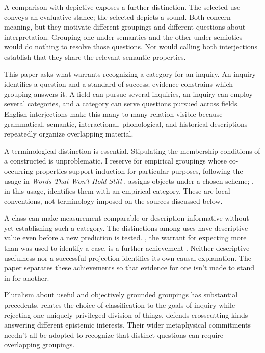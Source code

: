 A comparison with depictive  exposes a further distinction.
The selected  use conveys an evaluative stance; the selected
 depicts a sound. Both concern meaning, but they motivate
different groupings and different questions about interpretation. Grouping
one under semantics and the other under semiotics would do nothing to
resolve those questions. Nor would calling both interjections establish
that they share the relevant semantic properties.

This paper asks what warrants recognizing a category for an inquiry.
An inquiry identifies a question and a standard of success; evidence
constrains which grouping answers it. A field can pursue several inquiries,
an inquiry can employ several categories, and a category can serve questions
pursued across fields. English interjections make this many-to-many relation
visible because grammatical, semantic, interactional, phonological, and
historical descriptions repeatedly organize overlapping material.

A terminological distinction is essential. Stipulating the membership
conditions of a constructed  is unproblematic. I reserve
 for empirical groupings whose co-occurring properties support
induction for particular purposes, following the usage in
\textit{Words That Won't Hold Still} \citep[ch.~2]{reynolds2025hpcbook}.
 assigns objects under a chosen scheme;
, in this usage, identifies them with an empirical
category. These are local conventions, not terminology imposed on the
sources discussed below.

A class can make measurement comparable or description informative without
yet establishing such a category. The distinctions among 
uses have descriptive value even before a new prediction is tested.
, the warrant for expecting more than was used to
identify a case, is a further achievement \citep{Goodman1955}.
Neither descriptive usefulness nor a successful projection identifies its
own causal explanation. The paper separates these achievements so that
evidence for one isn't made to stand in for another.

Pluralism about useful and objectively grounded groupings has substantial
precedents. \textcite[5--7, 17--18]{dupre1993disorder} relates the choice of
classification to the goals of inquiry while rejecting one uniquely
privileged division of things. \textcite[63--64, 69--72]{khalidi2013}
defends crosscutting kinds answering different epistemic interests.
Their wider metaphysical commitments needn't all be adopted to recognize
that distinct questions can require overlapping groupings.

